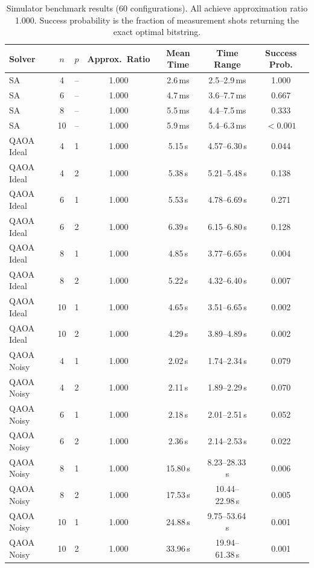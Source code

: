 \documentclass[11pt]{article}
\begin{document}
\begin{table}[t]
\centering
\caption{Simulator benchmark results (60 configurations). All achieve approximation ratio 1.000. Success probability is the fraction of measurement shots returning the exact optimal bitstring.}
\label{tab:sim_results}
\begin{tabular}{@{}lcccccc@{}}
\toprule
\textbf{Solver} & \textbf{$n$} & \textbf{$p$} & \textbf{Approx.\ Ratio} & \textbf{Mean Time} & \textbf{Time Range} & \textbf{Success Prob.} \\
\midrule
SA & 4 & -- & 1.000 & 2.6\,ms & 2.5--2.9\,ms & 1.000 \\
SA & 6 & -- & 1.000 & 4.7\,ms & 3.6--7.7\,ms & 0.667 \\
SA & 8 & -- & 1.000 & 5.5\,ms & 4.4--7.5\,ms & 0.333 \\
SA & 10 & -- & 1.000 & 5.9\,ms & 5.4--6.3\,ms & $< 0.001$ \\
\midrule
QAOA Ideal & 4 & 1 & 1.000 & 5.15\,s & 4.57--6.30\,s & 0.044 \\
QAOA Ideal & 4 & 2 & 1.000 & 5.38\,s & 5.21--5.48\,s & 0.138 \\
QAOA Ideal & 6 & 1 & 1.000 & 5.53\,s & 4.78--6.69\,s & 0.271 \\
QAOA Ideal & 6 & 2 & 1.000 & 6.39\,s & 6.15--6.80\,s & 0.128 \\
QAOA Ideal & 8 & 1 & 1.000 & 4.85\,s & 3.77--6.65\,s & 0.004 \\
QAOA Ideal & 8 & 2 & 1.000 & 5.22\,s & 4.32--6.40\,s & 0.007 \\
QAOA Ideal & 10 & 1 & 1.000 & 4.65\,s & 3.51--6.65\,s & 0.002 \\
QAOA Ideal & 10 & 2 & 1.000 & 4.29\,s & 3.89--4.89\,s & 0.002 \\
\midrule
QAOA Noisy & 4 & 1 & 1.000 & 2.02\,s & 1.74--2.34\,s & 0.079 \\
QAOA Noisy & 4 & 2 & 1.000 & 2.11\,s & 1.89--2.29\,s & 0.070 \\
QAOA Noisy & 6 & 1 & 1.000 & 2.18\,s & 2.01--2.51\,s & 0.052 \\
QAOA Noisy & 6 & 2 & 1.000 & 2.36\,s & 2.14--2.53\,s & 0.022 \\
QAOA Noisy & 8 & 1 & 1.000 & 15.80\,s & 8.23--28.33\,s & 0.006 \\
QAOA Noisy & 8 & 2 & 1.000 & 17.53\,s & 10.44--22.98\,s & 0.005 \\
QAOA Noisy & 10 & 1 & 1.000 & 24.88\,s & 9.75--53.64\,s & 0.001 \\
QAOA Noisy & 10 & 2 & 1.000 & 33.96\,s & 19.94--61.38\,s & 0.001 \\
\bottomrule
\end{tabular}
\end{table}
\end{document}
